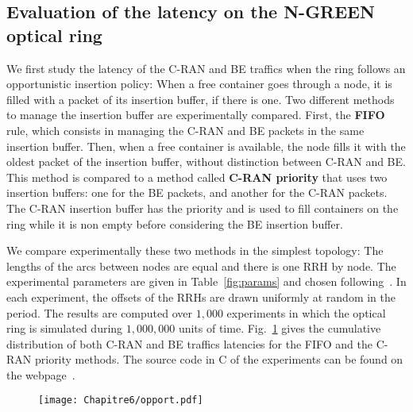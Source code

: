    \subsection{Evaluation of the latency on the N-GREEN optical ring}
   \label{sec:oportmethods}
   
   
  We first study the latency of the C-RAN and BE traffics when the ring follows an opportunistic insertion policy: When a free container goes through a node, it is filled with a packet of its insertion buffer, if there is one.
 Two different methods to manage the insertion buffer are experimentally compared. First, the \textbf{FIFO} rule, which consists in managing the C-RAN and BE packets in the same insertion buffer. Then, when a free container is available, the node fills it with the oldest packet of the insertion buffer, without distinction between C-RAN and BE. This method is compared to a method called \textbf{C-RAN priority} that uses two insertion buffers: one for the BE packets, and another for the C-RAN packets. The C-RAN insertion buffer has the priority and is used to fill containers on the ring while it is non empty before considering the BE insertion buffer.  
 
We compare experimentally these two methods in the simplest topology: The lengths of the arcs between nodes are equal and there is one RRH by node. The experimental parameters are given in Table~\ref{fig:params} and chosen following~\cite{ngreenarchitecture}. In each experiment, the offsets of the RRHs are drawn uniformly at random in the period. The results are computed over $1,000$ experiments in which the optical ring is simulated during $1,000,000$ units of time. Fig.~\ref{fig:resultopport} gives the cumulative distribution of both C-RAN and BE traffics latencies for the FIFO and the C-RAN priority methods. The source code in C of the experiments can be found on the webpage~\cite{webpage}.
  
   \begin{figure}[h]
        \begin{center}
      \texttt{[image: Chapitre6/opport.pdf]}
         \label{fig:resultopport}
  
\end{center} 
\end{figure}
   

